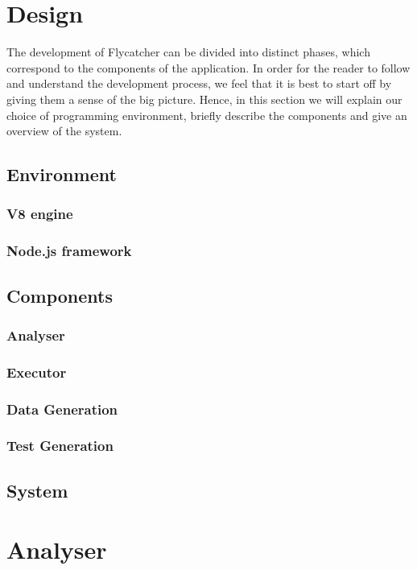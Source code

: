 \chapter{Design}
The development of Flycatcher can be divided into distinct phases, which correspond to the components of the application. In order for the reader to follow and understand the development process, we feel that it is best to start off by giving them a sense of the big picture. Hence, in this section we will explain our choice of programming environment, briefly describe the components and give an overview of the system.

\section{Environment}
\subsection{V8 engine}
\subsection{Node.js framework}

\section{Components}
\subsection{Analyser}
\subsection{Executor}
\subsection{Data Generation}
\subsection{Test Generation}

\section{System}



\chapter{Analyser}
